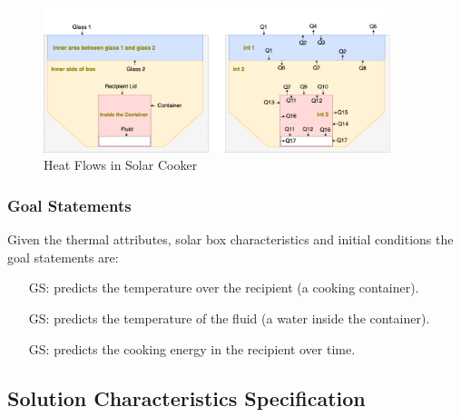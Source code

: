\documentclass[12pt]{article}
\newcounter{goalnum} %
\begin{document}
\begin{figure}[h!]
\begin{center}
\includegraphics[width=0.90\textwidth]{HeatFlow}
\caption{Heat Flows in Solar Cooker}
\label{Fig_HeatFlows} 
\end{center}
\end{figure}



\subsubsection{Goal Statements}

\noindent Given the thermal attributes, solar box characteristics and initial conditions the goal statements are:

\begin{itemize}

\item[GS\refstepcounter{goalnum}\thegoalnum \label{G_meaningfulLabel}:] predicts the temperature over the recipient (a cooking container).

\item[GS\refstepcounter{goalnum}\thegoalnum \label{G_meaningfulLabel}:] predicts the temperature of the fluid (a water inside the container).

\item[GS\refstepcounter{goalnum}\thegoalnum \label{G_meaningfulLabel}:] predicts the cooking energy in the recipient over time.

\end{itemize}

\subsection{Solution Characteristics Specification}
\end{document}
